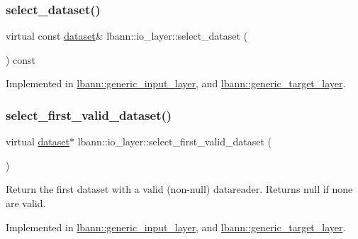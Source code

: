 \subsubsection{\texorpdfstring{select\+\_\+dataset()}{select\_dataset()}\hspace{0.1cm}{\footnotesize\ttfamily [2/2]}}
{\footnotesize\ttfamily virtual const \hyperlink{classlbann_1_1dataset}{dataset}\& lbann\+::io\+\_\+layer\+::select\+\_\+dataset (\begin{DoxyParamCaption}{ }\end{DoxyParamCaption}) const\hspace{0.3cm}{\ttfamily [pure virtual]}}



Implemented in \hyperlink{classlbann_1_1generic__input__layer_ab8468d077867b03098bbc71a38edaa15}{lbann\+::generic\+\_\+input\+\_\+layer}, and \hyperlink{classlbann_1_1generic__target__layer_ac83761609177fc272fa9c2fe098d4676}{lbann\+::generic\+\_\+target\+\_\+layer}.

\mbox{\label{classlbann_1_1io__layer_a7dbc671fd5a81094854a4d865f7631ce}} 
\subsubsection{\texorpdfstring{select\+\_\+first\+\_\+valid\+\_\+dataset()}{select\_first\_valid\_dataset()}}
{\footnotesize\ttfamily virtual \hyperlink{classlbann_1_1dataset}{dataset}$\ast$ lbann\+::io\+\_\+layer\+::select\+\_\+first\+\_\+valid\+\_\+dataset (\begin{DoxyParamCaption}{ }\end{DoxyParamCaption})\hspace{0.3cm}{\ttfamily [pure virtual]}}

Return the first dataset with a valid (non-\/null) datareader. Returns null if none are valid. 

Implemented in \hyperlink{classlbann_1_1generic__input__layer_a777aa11816a518098212408b569b6fb8}{lbann\+::generic\+\_\+input\+\_\+layer}, and \hyperlink{classlbann_1_1generic__target__layer_a22374687112c04dd6e0e35b94fe0e46c}{lbann\+::generic\+\_\+target\+\_\+layer}.

